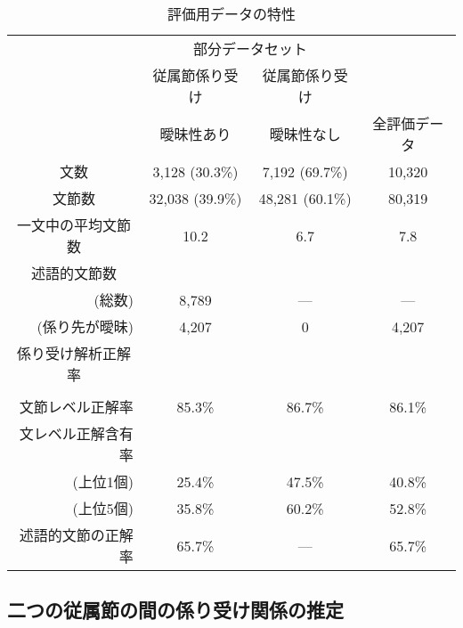 \begin{table}[t]
\vspace{-5mm}
  \begin{center}
	\caption{評価用データの特性}
   \label{tab:evalD}
\begin{tabular}[c]{|c||c|c||c|} \hline
	& \multicolumn{2}{|c||}{部分データセット} & \\ \cline{2-3}
	& 従属節係り受け	& 従属節係り受け &  \\ 
	& 曖昧性あり		& 曖昧性なし & 全評価データ \\ \hline\hline
文数 & 	3,128 (30.3\%)	& 7,192	(69.7\%) &	10,320	\\
文節数 & 32,038 (39.9\%) & 48,281 (60.1\%) & 80,319	\\
一文中の平均文節数	&	10.2	& 6.7	& 7.8 \\ 
述語的文節数 & & &  \\
\multicolumn{1}{|r||}{(総数)} & 8,789 & --- & --- \\ 
\multicolumn{1}{|r||}{(係り先が曖昧)} & 4,207 & 0 & 4,207 \\ \hline
係り受け解析正解率 	& & & \\
\cite{Fujio97aj,Fujio99aj}	& & & \\
\multicolumn{1}{|r||}{文節レベル正解率} & 85.3\% & 86.7\% & 86.1\% \\
\multicolumn{1}{|r||}{文レベル正解含有率} & &  &  \\
\multicolumn{1}{|r||}{(上位1個)} & 25.4\% & 47.5\% & 40.8\% \\
\multicolumn{1}{|r||}{(上位5個)} & 35.8\% & 60.2\% & 52.8\% \\  
\multicolumn{1}{|r||}{述語的文節の正解率} & 65.7\% & --- & 65.7\% \\\hline
\end{tabular}  
  \end{center}
\end{table}


\subsection{二つの従属節の間の係り受け関係の推定}
\label{subsubsec:experi-pair}


